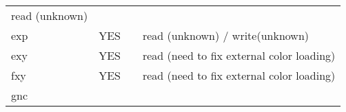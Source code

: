 \begin{longtable}[]{@{}llll@{}}
\begin{minipage}[t]{0.22\columnwidth}
read (unknown)\strut
\end{minipage}\tabularnewline
\begin{minipage}[t]{0.19\columnwidth}\raggedright
exp\strut
\end{minipage} & \begin{minipage}[t]{0.22\columnwidth}\raggedright
YES\strut
\end{minipage} & \begin{minipage}[t]{0.25\columnwidth}\raggedright
\strut
\end{minipage} & \begin{minipage}[t]{0.22\columnwidth}\raggedright
read (unknown) / write(unknown)\strut
\end{minipage}\tabularnewline
\begin{minipage}[t]{0.19\columnwidth}\raggedright
exy\strut
\end{minipage} & \begin{minipage}[t]{0.22\columnwidth}\raggedright
YES\strut
\end{minipage} & \begin{minipage}[t]{0.25\columnwidth}\raggedright
\strut
\end{minipage} & \begin{minipage}[t]{0.22\columnwidth}\raggedright
read (need to fix external color loading)\strut
\end{minipage}\tabularnewline
\begin{minipage}[t]{0.19\columnwidth}\raggedright
fxy\strut
\end{minipage} & \begin{minipage}[t]{0.22\columnwidth}\raggedright
YES\strut
\end{minipage} & \begin{minipage}[t]{0.25\columnwidth}\raggedright
\strut
\end{minipage} & \begin{minipage}[t]{0.22\columnwidth}\raggedright
read (need to fix external color loading)\strut
\end{minipage}\tabularnewline
\begin{minipage}[t]{0.19\columnwidth}\raggedright
gnc\strut
\end{minipage} & \begin{minipage}[t]{0.22\columnwidth}\raggedright
\strut
\end{minipage} & \begin{minipage}[t]{0.25\columnwidth}\raggedright
\strut
\end{minipage} & \begin{minipage}[t]{0.22\columnwidth}\raggedright

\end{minipage}
\end{longtable}
